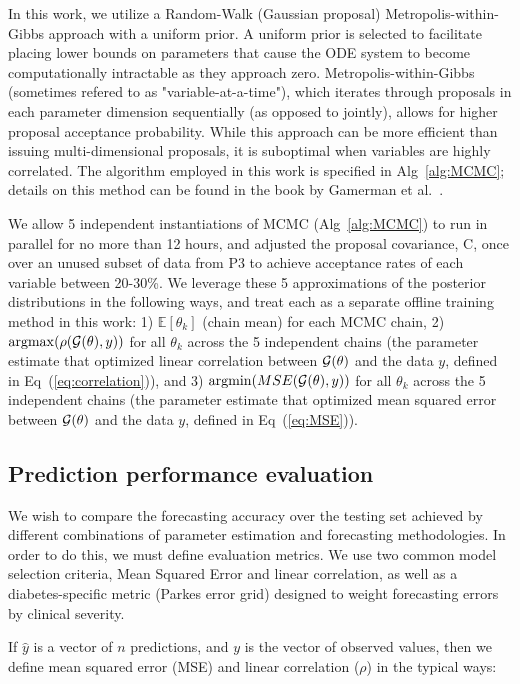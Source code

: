 \documentclass[10pt,letterpaper]{article}
\DeclareMathOperator*{\argmax}{argmax}
\DeclareMathOperator*{\argmin}{argmin}
\begin{document}
In this work, we utilize a Random-Walk (Gaussian proposal) Metropolis-within-Gibbs approach with a uniform prior. A uniform prior is selected to facilitate placing lower bounds on parameters that cause the ODE system to become computationally intractable as they approach zero. Metropolis-within-Gibbs (sometimes refered to as "variable-at-a-time"), which iterates through proposals in each parameter dimension sequentially (as opposed to jointly), allows for higher proposal acceptance probability. While this approach can be more efficient than issuing multi-dimensional proposals, it is suboptimal when variables are highly correlated.
The algorithm employed in this work is specified in Alg~\ref{alg:MCMC}; details on this method can be found in the book by Gamerman et al.~\cite{gamerman2006markov}.

We allow 5 independent instantiations of MCMC (Alg~\ref{alg:MCMC}) to run in parallel for no more than 12 hours, and adjusted the proposal covariance, C, once over an unused subset of data from P3 to achieve acceptance rates of each variable between 20-30\%. We leverage these 5 approximations of the posterior distributions in the following ways, and treat each as a separate offline training method in this work: 1) $\mathbb{E}[\theta_k]$ (chain mean) for each MCMC chain, 2) $\argmax(\rho({\cal G}(\theta),y))$ for all $\theta_k$ across the 5 independent chains (the parameter estimate that optimized linear correlation between ${\cal G}(\theta)$ and the data $y$, defined in Eq~(\ref{eq:correlation})), and 3) $\argmin(MSE({\cal G}(\theta),y))$ for all $\theta_k$ across the 5 independent chains (the parameter estimate that optimized mean squared error between ${\cal G}(\theta)$ and the data $y$, defined in Eq~(\ref{eq:MSE})).

\subsection{Prediction performance evaluation}
We wish to compare the forecasting accuracy over the testing set achieved by different combinations of parameter estimation and forecasting methodologies. In order to do this, we must define evaluation metrics.
We use two common model selection criteria, Mean Squared Error and linear correlation, as well as a diabetes-specific metric (Parkes error grid) designed to weight forecasting errors by clinical severity. 

If $\hat{y}$ is a vector of $n$ predictions, and $y$ is the vector of observed values, then we define mean squared error (MSE) and linear correlation ($\rho$) in the typical ways:
\end{document}
